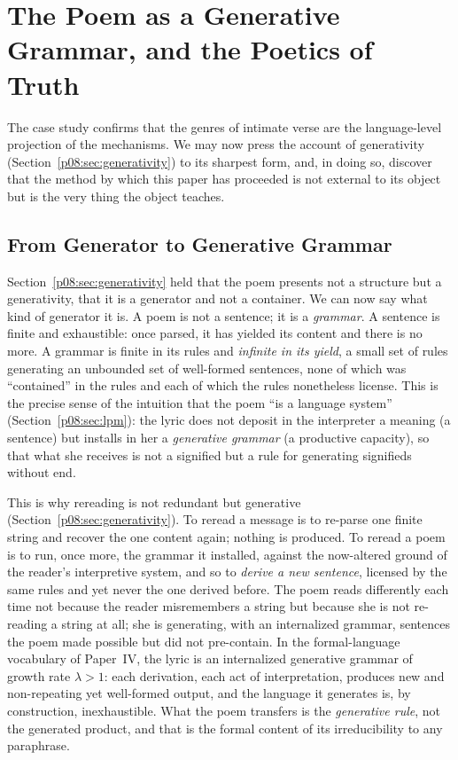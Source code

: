 \section{The Poem as a Generative Grammar, and the Poetics of Truth}\label{p08:sec:grammar}

The case study confirms that the genres of intimate verse are the language-level projection of the mechanisms. We may now press the account of generativity (Section~\ref{p08:sec:generativity}) to its sharpest form, and, in doing so, discover that the method by which this paper has proceeded is not external to its object but is the very thing the object teaches.

\subsection{From Generator to Generative Grammar}\label{p08:sec:grammar-grammar}

Section~\ref{p08:sec:generativity} held that the poem presents not a structure but a generativity, that it is a generator and not a container. We can now say what kind of generator it is. A poem is not a sentence; it is a \emph{grammar}. A sentence is finite and exhaustible: once parsed, it has yielded its content and there is no more. A grammar is finite in its rules and \emph{infinite in its yield}, a small set of rules generating an unbounded set of well-formed sentences, none of which was ``contained'' in the rules and each of which the rules nonetheless license. This is the precise sense of the intuition that the poem ``is a language system'' (Section~\ref{p08:sec:lpm}): the lyric does not deposit in the interpreter a meaning (a sentence) but installs in her a \emph{generative grammar} (a productive capacity), so that what she receives is not a signified but a rule for generating signifieds without end.

This is why rereading is not redundant but generative (Section~\ref{p08:sec:generativity}). To reread a message is to re-parse one finite string and recover the one content again; nothing is produced. To reread a poem is to run, once more, the grammar it installed, against the now-altered ground of the reader's interpretive system, and so to \emph{derive a new sentence}, licensed by the same rules and yet never the one derived before. The poem reads differently each time not because the reader misremembers a string but because she is not re-reading a string at all; she is generating, with an internalized grammar, sentences the poem made possible but did not pre-contain. In the formal-language vocabulary of Paper~IV, the lyric is an internalized generative grammar of growth rate $\lambda > 1$: each derivation, each act of interpretation, produces new and non-repeating yet well-formed output, and the language it generates is, by construction, inexhaustible. What the poem transfers is the \emph{generative rule}, not the generated product, and that is the formal content of its irreducibility to any paraphrase.

